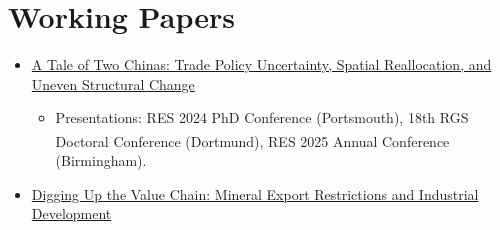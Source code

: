 \documentclass[11pt,letterpaper]{report}
\begin{document}
    \section*{Working Papers}
    \begin{itemize}
        \item \underline{A Tale of Two Chinas: Trade Policy Uncertainty, Spatial Reallocation, and Uneven Structural Change}
        \begin{itemize}[leftmargin=1em]
            \justifying
            \onehalfspacing
            \small
            \item Presentations: RES 2024 PhD Conference (Portsmouth), 18th RGS Doctoral Conference (Dortmund), RES 2025 Annual Conference\textsuperscript{\textdagger} (Birmingham).
        \end{itemize}
        \vspace{0.5em}
        \item \underline{Digging Up the Value Chain: Mineral Export Restrictions and Industrial Development}
        \begin{itemize}[leftmargin=1em]
            \justifying
            \onehalfspacing

\end{itemize}
\end{itemize}
\end{document}
